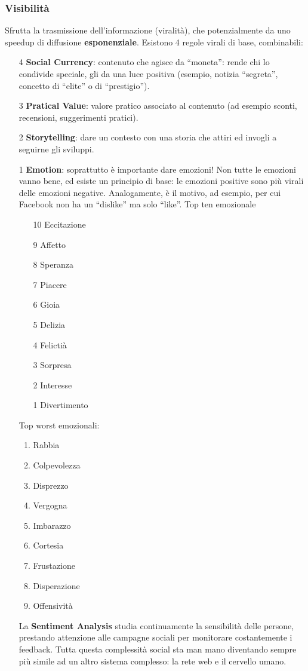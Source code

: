\subsubsection{Visibilit\`a}
Sfrutta la trasmissione dell'informazione (viralit\`a), che potenzialmente da uno speedup di diffusione \textbf{esponenziale}.
Esistono 4 regole virali di base, combinabili:
\begin{enumerate}

\item[4] \textbf{Social Currency}: contenuto che agisce da ``moneta'': rende chi lo condivide speciale, gli da una luce positiva (esempio, notizia ``segreta'', concetto di ``elite'' o di ``prestigio'').
\item[3] \textbf{Pratical Value}: valore pratico associato al contenuto (ad esempio sconti, recensioni, suggerimenti pratici).
\item[2] \textbf{Storytelling}: dare un contesto con una storia che attiri ed invogli a seguirne gli sviluppi.
\item[1] \textbf{Emotion}: soprattutto \`e importante dare emozioni! Non tutte le emozioni vanno bene, ed esiste un principio di base: le emozioni positive sono pi\`u virali delle emozioni negative. Analogamente, \`e il motivo, ad esempio, per cui Facebook non ha un ``dislike'' ma solo ``like''. Top ten emozionale
  \begin{enumerate}

  \item[10] Eccitazione
  \item[9] Affetto
  \item[8] Speranza
  \item[7] Piacere
  \item[6] Gioia
  \item[5] Delizia
  \item[4] Felicti\`a
  \item[3] Sorpresa
  \item[2] Interesse
  \item[1] Divertimento
  \end{enumerate}

  Top worst emozionali:
  \begin{enumerate}
    
  \item Rabbia
  \item Colpevolezza
  \item Disprezzo
  \item Vergogna
  \item Imbarazzo
  \item Cortesia
  \item Frustazione
  \item Disperazione
  \item Offensivit\`a
    
  \end{enumerate}

  La \textbf{Sentiment Analysis} studia continuamente la sensibilit\`a delle persone, prestando attenzione alle campagne sociali per monitorare costantemente i feedback. Tutta questa complessit\`a social sta man mano diventando sempre pi\`u simile ad un altro sistema complesso: la rete web e il cervello umano.
  
\end{enumerate}
